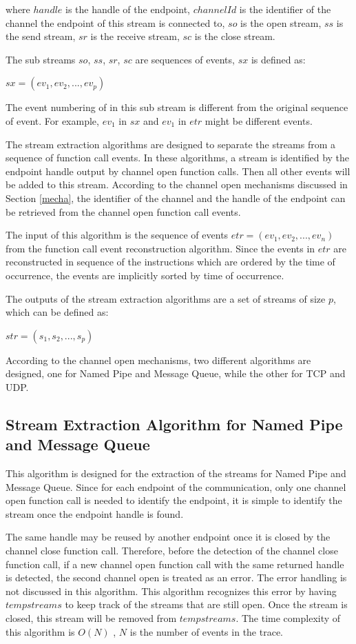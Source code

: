 where $handle$ is the handle of the endpoint, $channelId$ is the identifier of the channel the endpoint of this stream is connected to, $so$ is the open stream, $ss$ is the send stream, $sr$ is the receive stream, $sc$ is the close stream. 

The sub streams $so$, $ss$, $sr$, $sc$ are sequences of events, $sx$ is defined as:

$sx = (ev_1, ev_2, ..., ev_p)$

The event numbering of in this sub stream is different from the original sequence of event. For example, $ev_1$ in $sx$ and $ev_1$ in $etr$ might be different events.

The stream extraction algorithms are designed to separate the streams from a sequence of function call events. In these algorithms, a stream is identified by the endpoint handle output by channel open function calls. Then all other events will be added to this stream.  According to the channel open mechanisms discussed in Section \ref{mecha}, the identifier of the channel and the handle of the endpoint can be retrieved from the channel open function call events.

The input of this algorithm is the sequence of events $etr = (ev_1, ev_2, ..., ev_n)$ from the function call event reconstruction algorithm. Since the events in $etr$ are reconstructed in sequence of the instructions which are ordered by the time of occurrence, the events are implicitly sorted by time of occurrence. 

The outputs of the stream extraction algorithms are a set of streams of size $p$, which can be defined as:

$str = (s_1, s_2, ..., s_p)$

According to the channel open mechanisms, two different algorithms are designed, one for Named Pipe and Message Queue, while the other for TCP and UDP. 

\subsection{Stream Extraction Algorithm for Named Pipe and Message Queue}
This algorithm is designed for the extraction of the streams for Named Pipe and Message Queue. Since for each endpoint of the communication, only one channel open function call is needed to identify the endpoint, it is simple to identify the stream once the endpoint handle is found. 

The same handle may be reused by another endpoint once it is closed by the channel close function call. Therefore, before the detection of the channel close function call, if a new channel open function call with the same returned handle is detected, the second channel open is treated as an error. The error handling is not discussed in this algorithm. This algorithm recognizes this error by having $tempstreams$ to keep track of the streams that are still open. Once the stream is closed, this stream will be removed from $tempstreams$. The time complexity of this algorithm is $O(N)$ , $N$ is the number of events in the trace.


